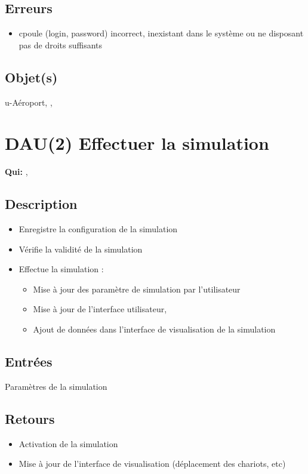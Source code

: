 	\subsection{Erreurs}
	\begin{itemize}
		\item cpoule (login, password) incorrect, inexistant dans le
		système ou ne disposant pas de droits suffisants \fatal
	\end{itemize}

	\subsection{Objet(s)}
		u-Aéroport, \event, \syslog

\section{DAU(2) Effectuer la simulation}
	\textbf{Qui:} \urt, \us

	\subsection{Description}
	\begin{itemize}
		\item Enregistre la configuration de la simulation
		\item Vérifie la validité de la simulation
		\item Effectue la simulation :
			\begin{itemize}
				\item Mise à jour des paramètre de simulation par l'utilisateur
				\item Mise à jour de l'interface utilisateur,
				\item Ajout de données dans l'interface de visualisation de la simulation
			\end{itemize}
	\end{itemize}

	\subsection{Entrées}
		Paramètres de la simulation

	\subsection{Retours}
	\begin{itemize}
		\item Activation de la simulation
		\item Mise à jour de l'interface de visualisation (déplacement des chariots, etc)
	\end{itemize}

